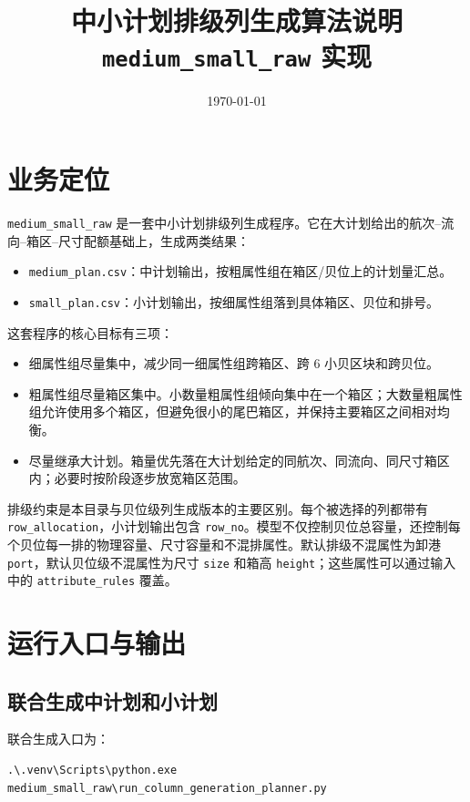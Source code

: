 \documentclass[UTF8,a4paper,11pt]{ctexart}
\title{中小计划排级列生成算法说明\\
\large \texttt{medium\_small\_raw} 实现}
\author{}
\date{\today}
\newcommand{\code}[1]{\nolinkurl{#1}}
\begin{document}
\maketitle
\tableofcontents
\newpage

\section{业务定位}

\code{medium_small_raw} 是一套中小计划排级列生成程序。它在大计划给出的航次--流向--箱区--尺寸配额基础上，生成两类结果：
\begin{itemize}
  \item \code{medium_plan.csv}：中计划输出，按粗属性组在箱区/贝位上的计划量汇总。
  \item \code{small_plan.csv}：小计划输出，按细属性组落到具体箱区、贝位和排号。
\end{itemize}

这套程序的核心目标有三项：
\begin{itemize}
  \item 细属性组尽量集中，减少同一细属性组跨箱区、跨 6 小贝区块和跨贝位。
  \item 粗属性组尽量箱区集中。小数量粗属性组倾向集中在一个箱区；大数量粗属性组允许使用多个箱区，但避免很小的尾巴箱区，并保持主要箱区之间相对均衡。
  \item 尽量继承大计划。箱量优先落在大计划给定的同航次、同流向、同尺寸箱区内；必要时按阶段逐步放宽箱区范围。
\end{itemize}

排级约束是本目录与贝位级列生成版本的主要区别。每个被选择的列都带有 \code{row_allocation}，小计划输出包含 \code{row_no}。模型不仅控制贝位总容量，还控制每个贝位每一排的物理容量、尺寸容量和不混排属性。默认排级不混属性为卸港 \code{port}，默认贝位级不混属性为尺寸 \code{size} 和箱高 \code{height}；这些属性可以通过输入中的 \code{attribute_rules} 覆盖。

\section{运行入口与输出}

\subsection{联合生成中计划和小计划}

联合生成入口为：
\begin{lstlisting}
.\.venv\Scripts\python.exe medium_small_raw\run_column_generation_planner.py
\end{lstlisting}
\end{document}
